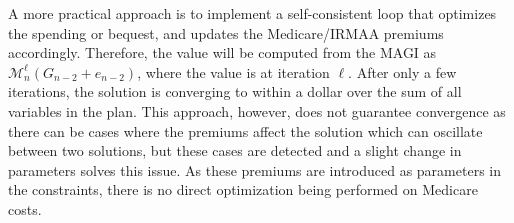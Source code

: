 \documentclass{report}[fleqn,12pt]
\begin{document}
\begin{description}[leftmargin=4em,style=multiline]
        A more practical approach is to implement a self-consistent loop that
	optimizes the spending or bequest, and updates the Medicare/IRMAA premiums accordingly.
	Therefore, the value will be computed from the MAGI
	as $\mathcal{M}_n^\ell(G_{n-2} + e_{n-2})$, where the value is at iteration $\ell$.
	After only a few iterations, the solution is converging to within a dollar over the
	sum of all variables in the plan. This approach, however, does not guarantee convergence
	as there can be cases where the premiums affect the solution which can oscillate between
	two solutions, but these cases are detected and a slight change in parameters
	solves this issue. As these premiums are introduced as parameters in the constraints,
	there is no direct optimization being performed on Medicare costs.
\end{description}
\end{document}

